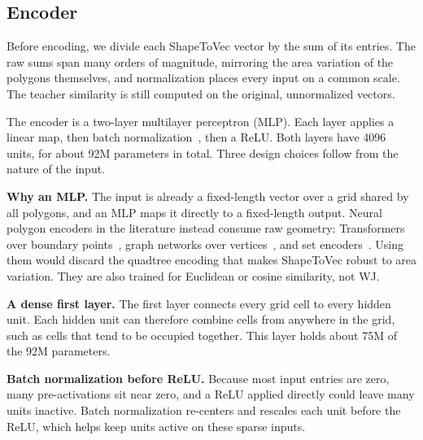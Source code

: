 \documentclass[conference]{IEEEtran}
\begin{document}
\subsection{Encoder}
\label{sec:embed}
Before encoding, we divide each ShapeToVec vector by the sum of its entries. The raw
sums span many orders of magnitude, mirroring the area variation of the polygons
themselves, and normalization places every input on a common scale. The teacher
similarity is still computed on the original, unnormalized vectors.

The encoder is a two-layer multilayer perceptron (MLP). Each layer applies a linear
map, then batch normalization~\cite{ioffe15bn}, then a ReLU. Both layers have 4096
units, for about 92M parameters in total. Three design choices follow from the
nature of the input.

\noindent\textbf{Why an MLP.} The input is already a fixed-length vector over a grid
shared by all polygons, and an MLP maps it directly to a fixed-length output. Neural
polygon encoders in the literature instead consume raw geometry: Transformers over
boundary points~\cite{mai22}, graph networks over vertices~\cite{polygongnn24}, and
set encoders~\cite{deepsets17}. Using them would discard the quadtree encoding that
makes ShapeToVec robust to area variation. They are also trained for Euclidean or
cosine similarity, not WJ.

\noindent\textbf{A dense first layer.} The first layer connects every grid cell to
every hidden unit. Each hidden unit can therefore combine cells from anywhere in the
grid, such as cells that tend to be occupied together. This layer holds about 75M of
the 92M parameters.

\noindent\textbf{Batch normalization before ReLU.} Because most input entries are
zero, many pre-activations sit near zero, and a ReLU applied directly could leave
many units inactive. Batch normalization re-centers and rescales each unit before
the ReLU, which helps keep units active on these sparse inputs.
\end{document}

